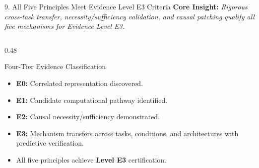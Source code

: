 \documentclass[aspectratio=169, 10pt]{beamer}
\begin{document}
\begin{frame}{9. All Five Principles Meet Evidence Level E3 Criteria}
  \textbf{Core Insight:} \textit{Rigorous cross-task transfer, necessity/sufficiency validation, and causal patching qualify all five mechanisms for Evidence Level E3.}

  \vspace{0.2cm}
  \begin{columns}[T]
    \begin{column}{0.48\textwidth}
      \begin{block}{Four-Tier Evidence Classification}
        \small
        \begin{itemize}
          \item \textbf{E0:} Correlated representation discovered.
          \item \textbf{E1:} Candidate computational pathway identified.
          \item \textbf{E2:} Causal necessity/sufficiency demonstrated.
          \item \textbf{E3:} Mechanism transfers across tasks, conditions, and architectures with predictive verification.
          \item All five principles achieve \textbf{Level E3} certification.
        \end{itemize}
      \end{block}
    \end{column}


\end{columns}
\end{frame}
\end{document}
